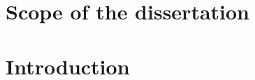 \documentclass{article}
\begin{document}
\chapter{Scope of the dissertation}
\chapter{Introduction}
\end{document}
